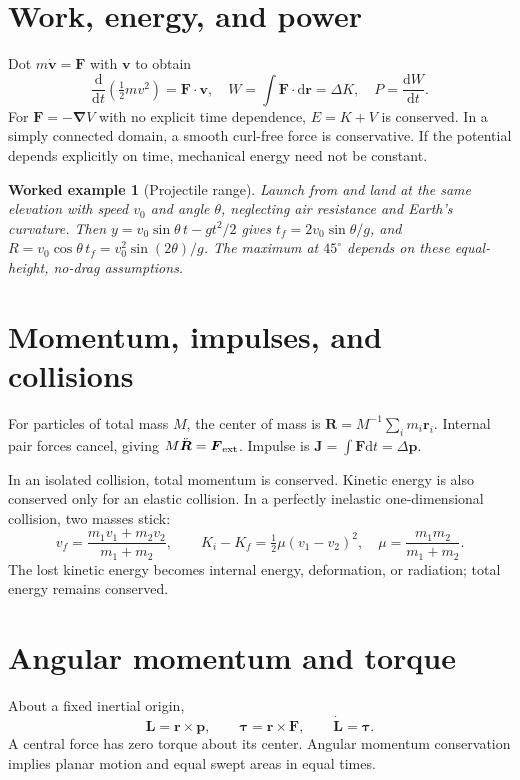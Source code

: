 \documentclass[11pt,oneside]{book}
\newcommand{\dd}{\mathrm{d}}
\newcommand{\vect}[1]{\boldsymbol{#1}}
\newcommand{\grad}{\boldsymbol{\nabla}}
\newcommand{\od}[2]{\frac{\dd #1}{\dd #2}}
\theoremstyle{reviewstyle}
\newtheorem{example}{Worked example}[chapter]
\begin{document}
\section{Work, energy, and power}
Dot $m\dot{\vect v}=\vect F$ with $\vect v$ to obtain
\begin{equation}
\od{}{t}\left(\tfrac12mv^2\right)=\vect F\cdot\vect v,
\quad W=\int\vect F\cdot\dd\vect r=\Delta K,
\quad P=\od{W}{t}.
\end{equation}
For $\vect F=-\grad V$ with no explicit time dependence, $E=K+V$ is conserved. In a simply connected domain, a smooth curl-free force is conservative. If the potential depends explicitly on time, mechanical energy need not be constant.
\begin{example}[Projectile range]
Launch from and land at the same elevation with speed $v_0$ and angle $\theta$, neglecting air resistance and Earth's curvature. Then $y=v_0\sin\theta\,t-gt^2/2$ gives $t_f=2v_0\sin\theta/g$, and $R=v_0\cos\theta\,t_f=v_0^2\sin(2\theta)/g$. The maximum at $45^\circ$ depends on these equal-height, no-drag assumptions.
\end{example}
\section{Momentum, impulses, and collisions}
For particles of total mass $M$, the center of mass is $\vect R=M^{-1}\sum_i m_i\vect r_i$. Internal pair forces cancel, giving $M\ddot{\vect R}=\vect F_{\rm ext}$. Impulse is $\vect J=\int\vect F\dd t=\Delta\vect p$.

In an isolated collision, total momentum is conserved. Kinetic energy is also conserved only for an elastic collision. In a perfectly inelastic one-dimensional collision, two masses stick:
\begin{equation}
v_f=\frac{m_1v_1+m_2v_2}{m_1+m_2},\qquad
K_i-K_f=\tfrac12\mu(v_1-v_2)^2,\quad
\mu=\frac{m_1m_2}{m_1+m_2}.
\end{equation}
The lost kinetic energy becomes internal energy, deformation, or radiation; total energy remains conserved.
\section{Angular momentum and torque}
About a fixed inertial origin,
\begin{equation}
\vect L=\vect r\times\vect p,\qquad
\vect\tau=\vect r\times\vect F,\qquad
\dot{\vect L}=\vect\tau.
\end{equation}
A central force has zero torque about its center. Angular momentum conservation implies planar motion and equal swept areas in equal times.
\end{document}
